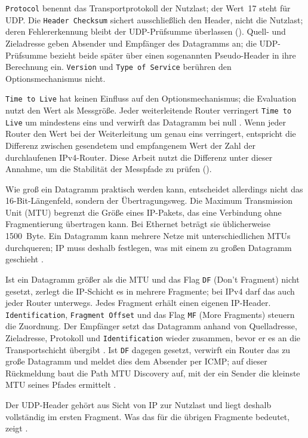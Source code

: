 \texttt{Protocol} benennt das Transportprotokoll der Nutzlast; der Wert~17 steht für UDP.
Die \texttt{Header Checksum} sichert ausschließlich den Header, nicht die
Nutzlast; deren Fehlererkennung bleibt der UDP-Prüfsumme überlassen (). Quell- und
Zieladresse geben Absender und Empfänger des Datagramms an; die UDP-Prüfsumme bezieht beide später über
einen sogenannten Pseudo-Header in ihre Berechnung ein.
\texttt{Version} und \texttt{Type of Service} berühren den Optionsmechanismus nicht.

\texttt{Time to Live} hat keinen Einfluss auf den Optionsmechanismus; die Evaluation nutzt den Wert als
Messgröße. Jeder weiterleitende Router verringert \texttt{Time to Live} um mindestens eins und verwirft
das Datagramm bei null \cite{rfc791}. Wenn jeder Router den Wert bei der Weiterleitung um genau eins
verringert, entspricht die Differenz zwischen gesendetem und empfangenem Wert der Zahl der durchlaufenen
IPv4-Router. Diese Arbeit nutzt die Differenz unter dieser Annahme, um die Stabilität der Messpfade zu
prüfen ().

Wie groß ein Datagramm praktisch werden kann, entscheidet allerdings nicht das 16-Bit-Längenfeld, sondern der
Übertragungsweg. Die Maximum Transmission Unit (MTU) begrenzt die Größe eines IP-Pakets, das eine Verbindung
ohne Fragmentierung übertragen kann. Bei Ethernet beträgt sie üblicherweise 1500~Byte. Ein Datagramm kann
mehrere Netze mit unterschiedlichen MTUs durchqueren; IP muss deshalb festlegen, was mit einem zu großen
Datagramm geschieht \cite{rfc791}.

Ist ein Datagramm größer als die MTU und das Flag \texttt{DF} (Don't Fragment) nicht gesetzt, zerlegt die
IP-Schicht es in mehrere Fragmente; bei IPv4 darf das auch jeder Router unterwegs. Jedes Fragment erhält
einen eigenen IP-Header. \texttt{Identification}, \texttt{Fragment Offset} und das Flag \texttt{MF}
(More Fragments) steuern die Zuordnung. Der Empfänger setzt das Datagramm anhand von Quelladresse,
Zieladresse, Protokoll und \texttt{Identification} wieder zusammen, bevor er es an die Transportschicht
übergibt \cite{rfc791}. Ist \texttt{DF} dagegen gesetzt, verwirft ein Router das zu
große Datagramm und meldet dies dem
Absender per ICMP; auf dieser Rückmeldung baut die Path MTU Discovery auf, mit der ein Sender die kleinste MTU
seines Pfades ermittelt \cite[Sec.~3.2]{rfc8085}.

Der UDP-Header gehört aus Sicht von IP zur Nutzlast und liegt deshalb vollständig im ersten Fragment.
Was das für die übrigen Fragmente bedeutet, zeigt .

